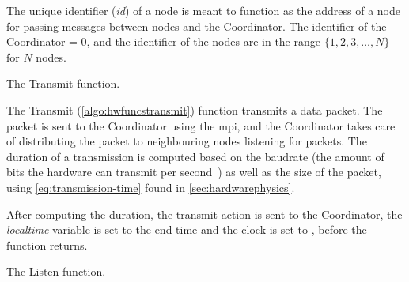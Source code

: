 The unique identifier (\textit{id}) of a node is meant to function as the address of a node for passing
messages between nodes and the Coordinator. The identifier of the Coordinator = $0$, and the identifier of the
nodes are in the range $\{ 1, 2, 3, \ldots, N \}$ for $N$ nodes.

\begin{algorithm}[ht]
    \DontPrintSemicolon
    

    \caption{The Transmit function.}
    \label{algo:hwfuncstransmit}
\end{algorithm}

The Transmit (\autoref{algo:hwfuncstransmit}) function transmits a data packet. The packet is sent
to the Coordinator using the \gls{mpi}, and the Coordinator takes care of distributing the packet to
neighbouring nodes listening for packets. The duration of a transmission is computed based on the
\gls{baudrate} (the amount of bits the hardware can transmit per second~\cite{website:baudrate-mathworks}) as
well as the size of the packet, using \autoref{eq:transmission-time} found in \autoref{sec:hardwarephysics}.

After computing the duration, the transmit action is sent to the Coordinator, the \textit{localtime} variable
is set to the end time and the clock is set to \KwNow, before the function returns. \medbreak

\begin{algorithm}[ht]
    \DontPrintSemicolon
    
    
    \caption{The Listen function.}
    \label{algo:hwfuncslisten}
\end{algorithm}

